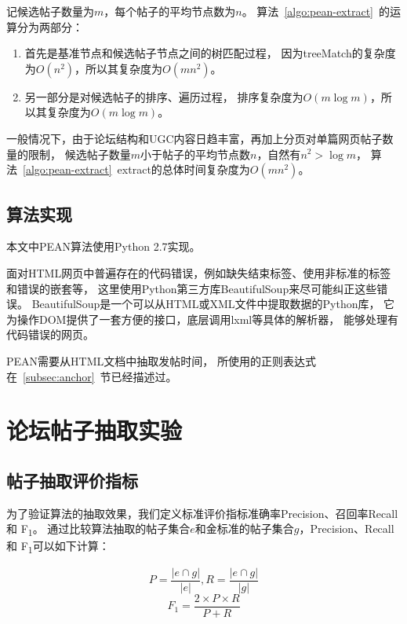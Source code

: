 记候选帖子数量为$m$，每个帖子的平均节点数为$n$。
算法~\ref{algo:pean-extract}~的运算分为两部分：
\begin{enumerate}
\item 首先是基准节点和候选帖子节点之间的树匹配过程，
因为treeMatch的复杂度为$O(n^2)$，所以其复杂度为$O(mn^2)$。
\item 另一部分是对候选帖子的排序、遍历过程，
排序复杂度为$O(m\log m)$，所以其复杂度为$O(m\log m)$。
\end{enumerate}

一般情况下，由于论坛结构和UGC内容日趋丰富，再加上分页对单篇网页帖子数量的限制，
候选帖子数量$m$小于帖子的平均节点数$n$，自然有$n^2 > \log m$，
算法~\ref{algo:pean-extract}~extract的总体时间复杂度为$O(mn^2)$。

\subsection{算法实现}
本文中PEAN算法使用Python 2.7实现。

面对HTML网页中普遍存在的代码错误，例如缺失结束标签、使用非标准的标签和错误的嵌套等，
这里使用Python第三方库BeautifulSoup来尽可能纠正这些错误。
BeautifulSoup是一个可以从HTML或XML文件中提取数据的Python库，
它为操作DOM提供了一套方便的接口，底层调用lxml等具体的解析器，
能够处理有代码错误的网页。

PEAN需要从HTML文档中抽取发帖时间，
所使用的正则表达式在~\ref{subsec:anchor}~节已经描述过。


\section{论坛帖子抽取实验}
\label{sec:pean-experiment}

\subsection{帖子抽取评价指标}
为了验证算法的抽取效果，我们定义标准评价指标准确率Precision、召回率Recall和
F\textsubscript{1}。
通过比较算法抽取的帖子集合$e$和金标准的帖子集合$g$，Precision、Recall和
F\textsubscript{1}可以如下计算：

\begin{equation}
P = \frac{\vert e \cap g \vert}{\vert e \vert}, 
R = \frac{\vert e \cap g \vert}{\vert g \vert}
\end{equation}
\begin{equation}
F_1 = \frac{2 \times P \times R}{P + R}
\end{equation}

